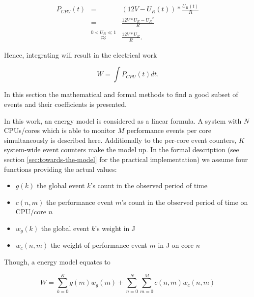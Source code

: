 \begin{eqnarray}
P_{CPU}(t) & = & (12V - U_R(t)) * \frac{U_R(t)}{R} \\
           & = & \frac{12V * U_R - {U_R}^2}{R} \\
           & \stackrel{0 < U_R \ll 1}{\approx} & \frac{12V * U_R}{R}.
\end{eqnarray}

Hence, integrating will result in the electrical work

\begin{equation}
  W = \int P_{CPU}(t)dt.
\end{equation}


\label{sec:model}

In this section the mathematical and formal methods to find a good subset of
events and their coefficients is presented.

\label{sec:model-properties}

In this work, an energy model is considered as a linear formula. A system with
$N$ CPUs/cores which is able to monitor $M$ performance events per core
simultaneously is described here. Additionally to the per-core event counters,
$K$ system-wide event counters make the model up. In the formal description (see
section \ref{sec:towards-the-model} for the practical implementation) we assume
four functions providing the actual values:

\begin{itemize}

\item $g(k)$ the global event $k$'s count in the observed period of time

\item $c(n, m)$ the performance event $m$'s count in the observed period of time
      on CPU/core $n$

\item $w_g(k)$ the global event $k$'s weight in \si{\joule}

\item $w_c(n, m)$ the weight of performance event $m$ in \si{\joule} on core
$n$

\end{itemize}

Though, a energy model equates to

\begin{equation}
W = \sum\limits_{k=0}^K g(m) w_g(m) +
\sum\limits_{n=0}^N \sum\limits_{m=0}^M c(n, m) w_c(n,m)
\end{equation}

